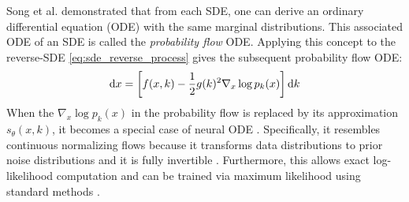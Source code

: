 Song et al. \cite{song_score-based_2021} demonstrated that from each SDE, one can derive an ordinary differential equation (ODE) with the same marginal distributions. This associated ODE of an SDE is called the \textit{probability flow} ODE. Applying this concept to the reverse-SDE \eqref{eq:sde_reverse_process} gives the subsequent probability flow ODE:
\begin{equation} \label{eq:sde_probability_flow}
\mathrm{d} x = \left[ f(x, k) - \frac{1}{2} g(k)^2 \nabla_x \log p_k(x)\right] \mathrm{d} k 
\end{equation}
When the $\nabla_x \log p_k(x)$ in the probability flow is replaced by its approximation $s_\theta(x, k)$, it becomes a special case of neural ODE \cite{chen_neural_2018}. Specifically, it resembles continuous normalizing flows because it transforms data distributions to prior noise distributions and it is fully invertible \cite{grathwohl_ffjord_2018}. Furthermore, this allows exact log-likelihood computation and can be trained via maximum likelihood using standard methods \cite{chen_neural_2018}. 







